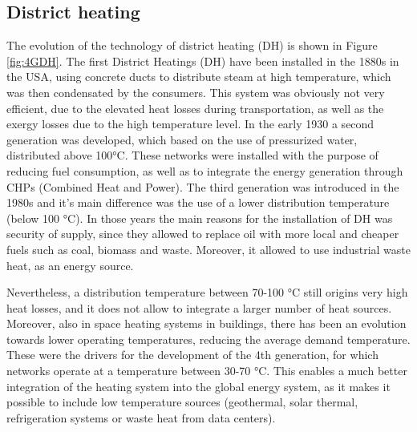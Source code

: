 \documentclass{article}
\begin{document}
\subsection{District heating}
The evolution of the technology of district heating (DH) is shown in Figure \ref{fig:4GDH}.
The first District Heatings (DH) have been installed in the 1880s in the USA, using concrete ducts to distribute steam at high temperature, which was then condensated by the consumers. This system was obviously not very efficient, due to the elevated heat losses during transportation, as well as the exergy losses due to the high temperature level. In the early 1930 a second generation was developed, which based on the use of pressurized water, distributed above 100\si{\celsius}. These networks were installed with the purpose of reducing fuel consumption, as well as to integrate the energy generation through CHPs (Combined Heat and Power). The third generation was introduced in the 1980s and it's main difference was the use of a lower distribution temperature (below 100 \si{\celsius}). In those years the main reasons for the installation of DH was security of supply, since they allowed to replace oil with more local and cheaper fuels such as coal, biomass and waste. Moreover, it allowed to use industrial waste heat, as an energy source. 

Nevertheless, a distribution temperature between 70-100 \si{\celsius} still origins very high heat losses, and it does not allow to integrate a larger number of heat sources. Moreover, also in space heating systems in buildings, there has been an evolution towards lower operating temperatures, reducing the average demand temperature. These were the drivers for the development of the 4th generation, for which networks operate at a temperature between 30-70 \si{\celsius}. This enables a much better integration of the heating system into the global energy system, as it makes it possible to include low temperature sources (geothermal, solar thermal, refrigeration systems or waste heat from data centers).
 
\end{document}
